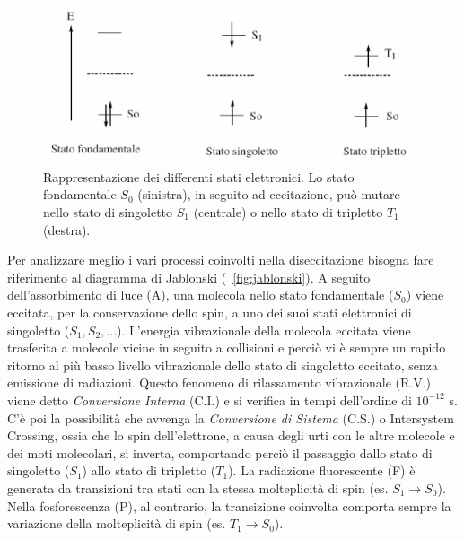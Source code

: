 \begin{figure}
 \centering
\includegraphics[scale=.35]{img/CAP1spin.png}
 \caption{\small{ Rappresentazione dei differenti stati elettronici. Lo stato fondamentale $S_0$ (sinistra), in seguito ad
eccitazione, può mutare nello stato di singoletto $S_1$ (centrale) o nello stato di tripletto $T_1$ (destra). }}
 \label{fig:spin}
\end{figure}

Per analizzare meglio i vari processi coinvolti nella diseccitazione bisogna fare riferimento al diagramma di Jablonski (\figurename~\ref{fig:jablonski}).
A seguito dell'assorbimento di luce (A), una molecola nello stato fondamentale ($S_0$) viene eccitata, per la conservazione dello spin, a uno dei suoi stati elettronici di singoletto ($S_1, S_2,...$). 
L'energia vibrazionale della molecola eccitata viene trasferita a molecole vicine in seguito a collisioni e perciò vi è sempre un rapido ritorno al più basso livello vibrazionale dello stato di singoletto eccitato, senza emissione di radiazioni.
Questo fenomeno di rilassamento vibrazionale (R.V.) viene detto \textit{Conversione Interna} (C.I.) e si verifica in tempi dell'ordine di $10^{-12}$ s. 
C'è poi la possibilità che avvenga la \textit{Conversione di Sistema} (C.S.) o Intersystem Crossing, ossia che lo spin dell'elettrone, a causa degli urti con le altre molecole e dei moti molecolari, si inverta, comportando perciò il passaggio dallo stato di singoletto ($S_1$) allo stato di tripletto ($T_1$). 
La radiazione fluorescente (F) è generata da transizioni tra stati con la stessa molteplicità di spin (es. $S_1 \to S_0$). 
Nella fosforescenza (P), al contrario, la transizione coinvolta comporta sempre la variazione della molteplicità di spin (es. $T_1 \to S_0$).

